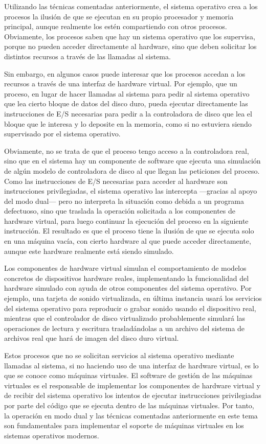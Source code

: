 {} Utilizando las técnicas comentadas anteriormente, el sistema
operativo crea a los procesos la ilusión de que se ejecutan en su propio
procesador y memoria principal, aunque realmente los estén compartiendo
con otros procesos. Obviamente, los procesos saben que hay un sistema
operativo que los supervisa, porque no pueden acceder directamente al
hardware, sino que deben solicitar los distintos recursos a través de
las llamadas al sistema.

Sin embargo, en algunos casos puede interesar que los procesos accedan a
los recursos a través de una interfaz de hardware virtual. Por ejemplo,
que un proceso, en lugar de hacer llamadas al sistema para pedir al
sistema operativo que lea cierto bloque de datos del disco duro, pueda
ejecutar directamente las instrucciones de E/S necesarias para pedir a
la controladora de disco que lea el bloque que le interesa y lo deposite
en la memoria, como si no estuviera siendo supervisado por el sistema
operativo.

Obviamente, no se trata de que el proceso tengo acceso a la controladora
real, sino que en el sistema hay un componente de software que ejecuta
una simulación de algún modelo de controladora de disco al que llegan
las peticiones del proceso. Como las instrucciones de E/S necesarias
para acceder al hardware son instrucciones privilegiadas, el sistema
operativo las intercepta ---gracias al apoyo del modo dual--- pero no
interpreta la situación como debida a un programa defectuoso, sino que
traslada la operación solicitada a los componentes de hardware virtual,
para luego continuar la ejecución del proceso en la siguiente
instrucción. El resultado es que el proceso tiene la ilusión de que se
ejecuta solo en una máquina vacía, con cierto hardware al que puede
acceder directamente, aunque este hardware realmente está siendo
simulado.

Los componentes de hardware virtual simulan el comportamiento de modelos
concretos de dispositivos hardware reales, implementando la
funcionalidad del hardware simulado con ayuda de otros componentes del
sistema operativo. Por ejemplo, una tarjeta de sonido virtualizada, en
última instancia usará los servicios del sistema operativo para
reproducir o grabar sonido usando el dispositivo real, mientras que el
controlador de disco virtualizado probablemente simulará las operaciones
de lectura y escritura trasladándolas a un archivo del sistema de
archivos real que hará de imagen del disco duro virtual.

Estos procesos que no se solicitan servicios al sistema operativo
mediante llamadas al sistema, si no haciendo uso de una interfaz de
hardware virtual, es lo que se conoce como máquinas virtuales. El
software de gestión de las máquinas virtuales es el responsable de
implementar los componentes de hardware virtual y de recibir del sistema
operativo los intentos de ejecutar instrucciones privilegiadas por parte
del código que se ejecuta dentro de las máquinas virtuales. Por tanto,
la operación en modo dual y las técnicas comentadas anteriormente en
este tema son fundamentales para implementar el soporte de máquinas
virtuales en los sistemas operativos modernos.

